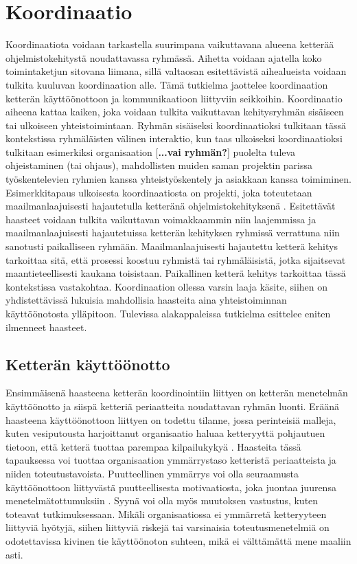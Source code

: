 \chapter{Koordinaatio}

Koordinaatiota voidaan tarkastella suurimpana vaikuttavana alueena ketterää ohjelmistokehitystä noudattavassa ryhmässä. Aihetta voidaan ajatella koko toimintaketjun sitovana liimana, sillä valtaosan esitettävistä aihealueista voidaan tulkita kuuluvan koordinaation alle. Tämä tutkielma jaottelee koordinaation ketterän käyttöönottoon ja kommunikaatioon liittyviin seikkoihin. Koordinaatio aiheena kattaa kaiken, joka voidaan tulkita vaikuttavan kehitysryhmän sisäiseen tai ulkoiseen yhteistoimintaan. Ryhmän sisäiseksi koordinaatioksi tulkitaan tässä kontekstissa ryhmäläisten välinen interaktio, kun taas ulkoiseksi koordinaatioksi tulkitaan esimerkiksi organisaation [\textbf{...vai ryhmän?}] puolelta tuleva ohjeistaminen (tai ohjaus), mahdollisten muiden saman projektin parissa työskentelevien ryhmien kanssa yhteistyöskentely ja asiakkaan kanssa toimiminen. Esimerkkitapaus ulkoisesta koordinaatiosta on projekti, joka toteutetaan maailmanlaajuisesti hajautetulla ketteränä ohjelmistokehityksenä \cite{ALZOUBI201622}. Esitettävät haasteet voidaan tulkita vaikuttavan voimakkaammin niin laajemmissa ja maailmanlaajuisesti hajautetuissa ketterän kehityksen ryhmissä verrattuna niin sanotusti paikalliseen ryhmään. Maailmanlaajuisesti hajautettu ketterä kehitys tarkoittaa sitä, että prosessi koostuu ryhmistä tai ryhmäläisistä, jotka sijaitsevat maantieteellisesti kaukana toisistaan. Paikallinen ketterä kehitys tarkoittaa tässä kontekstissa vastakohtaa. Koordinaation ollessa varsin laaja käsite, siihen on yhdistettävissä lukuisia mahdollisia haasteita aina yhteistoiminnan käyttöönotosta ylläpitoon. Tulevissa alakappaleissa tutkielma esittelee eniten ilmenneet haasteet.

\section{Ketterän käyttöönotto}

Ensimmäisenä haasteena ketterän koordinointiin liittyen on ketterän menetelmän käyttöönotto ja siispä ketteriä periaatteita noudattavan ryhmän luonti. Eräänä haasteena käyttöönottoon liittyen on todettu tilanne, jossa perinteisiä malleja, kuten vesiputousta harjoittanut organisaatio haluaa ketteryyttä pohjautuen tietoon, että ketterä tuottaa parempaa kilpailukykyä \cite{MCKNIGHT2014168}. Haasteita tässä tapauksessa voi tuottaa organisaation ymmärrystaso ketteristä periaatteista ja niiden toteutustavoista. Puutteellinen ymmärrys voi olla seuraamusta käyttöönottoon liittyvästä puutteellisesta motivaatiosta, joka juontaa juurensa menetelmätottumuksiin \cite{GREGORY201692}. Syynä voi olla myös muutoksen vastustus, kuten \cite{SELLERISILVA201520} toteavat tutkimuksessaan. Mikäli organisaatiossa ei ymmärretä ketteryyteen liittyviä hyötyjä, siihen liittyviä riskejä tai varsinaisia toteutusmenetelmiä on odotettavissa kivinen tie käyttöönoton suhteen, mikä ei välttämättä mene maaliin asti.

